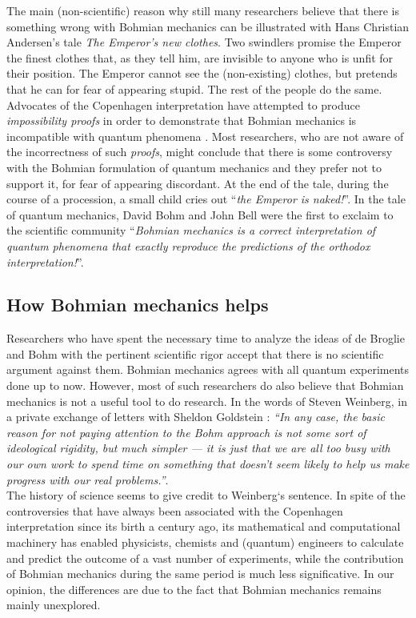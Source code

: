 \documentclass[onecolumn,nofootinbib, secnumarabic, amsmath, nobibnotes,11pt,aps,pra]{revtex4-1}
\begin{document}
The main (non-scientific) reason why still many researchers believe that there is something wrong with Bohmian mechanics can be illustrated with Hans Christian Andersen's tale \emph{The Emperor's new clothes}. Two swindlers promise the Emperor the finest clothes that, as they tell him,  are invisible to anyone who is unfit for their position. The Emperor cannot see the (non-existing) clothes, but pretends that he can for fear of appearing stupid.  The rest of the people do the same. Advocates of the Copenhagen interpretation have attempted to produce \emph{impossibility proofs} in order to demonstrate that Bohmian mechanics is incompatible with quantum phenomena \cite{om.impossibility_proofs}. Most researchers, who are not aware of the incorrectness of such \emph{proofs}, might conclude that there is some controversy with the Bohmian formulation of quantum mechanics and they prefer not to support it, for fear of appearing discordant. At the end of the tale, during the course of a procession, a small child cries out ``\textit{the Emperor is naked!}''. In the tale of quantum mechanics, David Bohm \cite{om.bohm1952a,om.bohm1952b} and John Bell \cite{om.Bell1987} were the first to exclaim to the scientific community ``\textit{Bohmian mechanics is a correct interpretation of quantum phenomena that exactly reproduce the predictions of the orthodox interpretation!}''.

\subsection*{How Bohmian mechanics helps}\label{sec_why}


Researchers who have spent the necessary time to analyze the ideas of de Broglie and Bohm with the pertinent scientific rigor accept that there is no scientific argument against them. Bohmian mechanics agrees with all quantum experiments done up to now. However, most of such researchers do also believe that Bohmian mechanics is not a useful tool to do research. In the words of Steven Weinberg, in a private exchange of letters with Sheldon Goldstein \cite{om.Weinberg}: \textit{``In any case, the basic reason for not paying attention to the Bohm approach is not some sort of ideological rigidity, but much simpler --- it is just that we are all too busy with our own work to spend time on something that doesn't seem likely to help us make progress with our real problems.''}.\\

The history of science seems to give credit to Weinberg`s sentence. In spite of the controversies that have always been associated with the Copenhagen interpretation since its birth a century ago, its mathematical and computational machinery has enabled physicists, chemists and (quantum) engineers to calculate and predict the outcome of a vast number of experiments, while the contribution of Bohmian mechanics during the same period is much less significative. In our opinion, the differences are due to the fact that Bohmian mechanics remains mainly unexplored.
\end{document}

